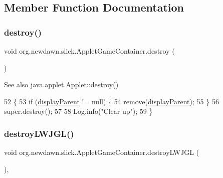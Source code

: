 \subsection{Member Function Documentation}
\mbox{\label{classorg_1_1newdawn_1_1slick_1_1_applet_game_container_aa7a9fa819a8255d5b902f9e941d31491}} 
\subsubsection{\texorpdfstring{destroy()}{destroy()}}
{\footnotesize\ttfamily void org.\+newdawn.\+slick.\+Applet\+Game\+Container.\+destroy (\begin{DoxyParamCaption}{ }\end{DoxyParamCaption})\hspace{0.3cm}{\ttfamily [inline]}}

\begin{DoxySeeAlso}{See also}
java.\+applet.\+Applet\+::destroy() 
\end{DoxySeeAlso}

\begin{DoxyCode}
52                          \{
53       \textcolor{keywordflow}{if} (\mbox{\hyperlink{classorg_1_1newdawn_1_1slick_1_1_applet_game_container_a62b5a90dcfc53b23717ea63133f86332}{displayParent}} != null) \{
54          \textcolor{keyword}{remove}(\mbox{\hyperlink{classorg_1_1newdawn_1_1slick_1_1_applet_game_container_a62b5a90dcfc53b23717ea63133f86332}{displayParent}});
55       \}
56       super.destroy();
57       
58       Log.info(\textcolor{stringliteral}{"Clear up"});
59    \}
\end{DoxyCode}
\mbox{\label{classorg_1_1newdawn_1_1slick_1_1_applet_game_container_af77f7ab58fe34f57e2e81343edde8c18}} 
\subsubsection{\texorpdfstring{destroy\+L\+W\+J\+G\+L()}{destroyLWJGL()}}
{\footnotesize\ttfamily void org.\+newdawn.\+slick.\+Applet\+Game\+Container.\+destroy\+L\+W\+J\+GL (\begin{DoxyParamCaption}{ }\end{DoxyParamCaption})\hspace{0.3cm}{\ttfamily [inline]}, {\ttfamily [private]}}

